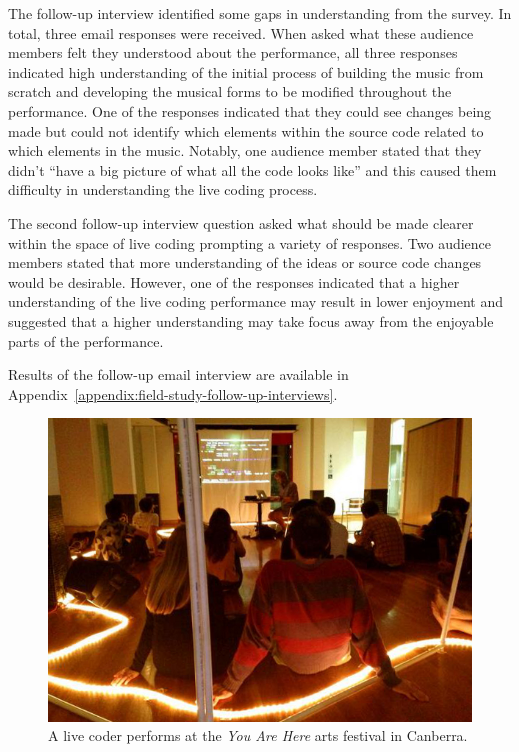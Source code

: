 The follow-up interview identified some gaps in understanding from the survey. In total, three email responses were received. When asked what these audience members felt they understood about the performance, all three responses indicated high understanding of the initial process of building the music from scratch and developing the musical forms to be modified throughout the performance. One of the responses indicated that they could see changes being made but could not identify which elements within the source code related to which elements in the music. Notably, one audience member stated that they didn't ``have a big picture of what all the code looks like'' and this caused them difficulty in understanding the live coding process. 

The second follow-up interview question asked what should be made clearer within the space of live coding prompting a variety of responses. Two audience members stated that more understanding of the ideas or source code changes would be desirable. However, one of the responses indicated that a higher understanding of the live coding performance may result in lower enjoyment and suggested that a higher understanding may take focus away from the enjoyable parts of the performance. 

Results of the follow-up email interview are available in Appendix~\ref{appendix:field-study-follow-up-interviews}.

\begin{figure}
\centering
\includegraphics[width=\textwidth]{../images/study-1-you-are-here.jpg}
\caption[A live coder performs at the \textit{You Are Here} arts festival]{A live coder performs at the \textit{You Are Here} arts festival in Canberra.}
\label{fig:you-are-here-performance}
\end{figure}

